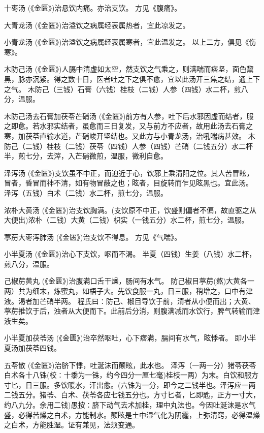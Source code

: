 \documentclass[a4paper,12pt,UTF8,twoside]{ctexbook}
\begin{document}
	十枣汤
	(《金匮》)治悬饮内痛。亦治支饮。
	方见《腹痛》。
	
	大青龙汤
	(《金匮》)治溢饮之病属经表属热者，宜此凉发之。
	
	小青龙汤
	(《金匮》)治溢饮之病属经表属寒者，宜此温发之。
	以上二方，俱见《伤寒》。
	
	木防己汤
	(《金匮》)人膈中清虚如太空，然支饮之气乘之，则满喘而痞坚，面色黧黑，脉亦沉紧。得之数十日，医者吐之下之俱不愈，宜以此汤开三焦之结，通上下之气。
	木防己（三钱）石膏（六钱）桂枝（二钱）人参（四钱）水二杯，煎八分，温服。
	
	木防己汤去石膏加茯苓芒硝汤
	(《金匮》)前方有人参，吐下后水邪因虚而结者，服之即愈。若水邪实结者，虽愈而三日复发，又与前方不应者，故用此汤去石膏之寒，加茯苓直输水道，芒硝峻开坚结也。又此方与小青龙汤，治吼喘病甚效。
	木防己（二钱）桂枝（二钱）茯苓（四钱）人参（四钱）芒硝（二钱五分）水二杯半，煎七分，去滓，入芒硝微煎，温服，微利自愈。
	
	泽泻汤
	(《金匮》)支饮虽不中正，而迫近于心，饮邪上乘清阳之位。其人苦冒眩，冒者，昏冒而神不清，如有物冒蔽之也；眩者，目旋转而乍见眩黑也。宜此汤。
	泽泻（五钱）白术（二钱）水二杯，煎七分，温服。
	
	浓朴大黄汤
	(《金匮》)治支饮胸满。(支饮原不中正，饮盛则偏者不偏，故直驱之从大便出)浓朴（二钱）大黄（二钱）枳实（一钱五分）水二杯，煎七分，温服。
	
	葶苈大枣泻肺汤
	(《金匮》)治支饮不得息。
	方见《气喘》。
	
	小半夏汤
	(《金匮》)治心下支饮，呕而不渴。
	半夏（四钱）生姜（八钱）水二杯，煎八分，温服。
	
	己椒苈黄丸
	(《金匮》)治腹满口舌干燥，肠间有水气。
	防己椒目葶苈(熬)大黄各一两）共为细末，炼蜜丸，如梧子大。先饮食服一丸，日三服，稍增之，口中有津液。渴者加芒硝半两。
	程氏曰∶防己、椒目导饮于前，清者从小便而出；大黄、葶苈推饮于后，浊者从大便而下。此前后分消，则腹满减而水饮行，脾气转输而津液生矣。
	
	小半夏加茯苓汤
	(《金匮》)治卒然呕吐，心下痞满，膈间有水气，眩悸者。
	即小半夏汤加茯苓四钱。
	
	五苓散
	(《金匮》)治脐下悸，吐涎沫而颠眩，此水也。
	泽泻（一两一分）猪苓茯苓白术各十八铢(校∶十黍为一铢，约今四分一厘七毫)桂枝一两）为末。白饮和服方寸匕，日三服。多饮暖水，汗出愈。(六铢为一分，即今之二钱半也。泽泻应一两二钱五分。猪苓、白术、茯苓各应七钱五分也。方寸匕者，匕即匙，正方一寸大，约八九分。余用二钱)愚按∶脐下动气去术加桂，理中丸法也。今因吐涎沫是水气盛，必得苦燥之白术，方能制水。颠眩是土中湿气化为阴霾，上弥清窍，必得温燥之白术，方能胜湿。证有兼见，法须变通。
	
\end{document}
